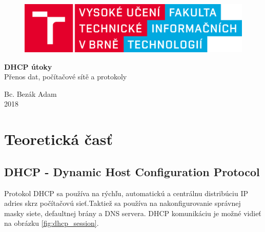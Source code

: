 \documentclass{article}
\begin{document}
\begin{titlepage}

\begin{center}

\begin{figure}[h!]
\centering
\includegraphics[scale=0.15]{FIT.png}
\end{figure}

\Huge{\textbf {DHCP útoky\\}}
\huge{Přenos dat, počítačové sítě a protokoly\\}
\vspace{-1 mm}

\end{center}
\Large{
Bc. Bezák Adam\\
\hfill 2018}

\end{titlepage}


\tableofcontents
\newpage

\section{Teoretická časť}

\subsection{DHCP - Dynamic Host Configuration Protocol}
Protokol DHCP sa používa na rýchľu, automatickú a centrálnu distribúciu IP adries skrz počítačovú sieť.Taktiež sa používa na nakonfigurovanie správnej masky siete, defaultnej brány a DNS servera.
DHCP komunikáciu je možné vidieť na obrázku \ref{fig:dhcp_session}.
\end{document}
